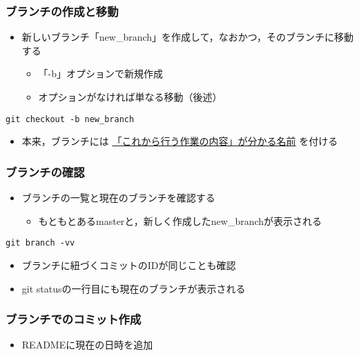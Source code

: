 \documentclass[a4paper,twoside,twocolumn]{bxjsarticle}
\begin{document}
\subsubsection{ブランチの作成と移動}
\label{sec-1-6-3}
\begin{itemize}
\item 新しいブランチ「new\_branch」を作成して，なおかつ，そのブランチに移動する
\begin{itemize}
\item 「-b」オプションで新規作成
\item オプションがなければ単なる移動（後述）
\end{itemize}
\end{itemize}

\begin{verbatim}
git checkout -b new_branch
\end{verbatim}

\begin{itemize}
\item 本来，ブランチには \uline{「これから行う作業の内容」が分かる名前} を付ける
\end{itemize}

\subsubsection{ブランチの確認}
\label{sec-1-6-4}
\begin{itemize}
\item ブランチの一覧と現在のブランチを確認する
\begin{itemize}
\item もともとあるmasterと，新しく作成したnew\_branchが表示される
\end{itemize}
\end{itemize}

\begin{verbatim}
git branch -vv
\end{verbatim}

\begin{itemize}
\item ブランチに紐づくコミットのIDが同じことも確認
\item git statusの一行目にも現在のブランチが表示される
\end{itemize}

\subsubsection{ブランチでのコミット作成}
\label{sec-1-6-5}
\begin{itemize}
\item READMEに現在の日時を追加
\end{itemize}
\end{document}
